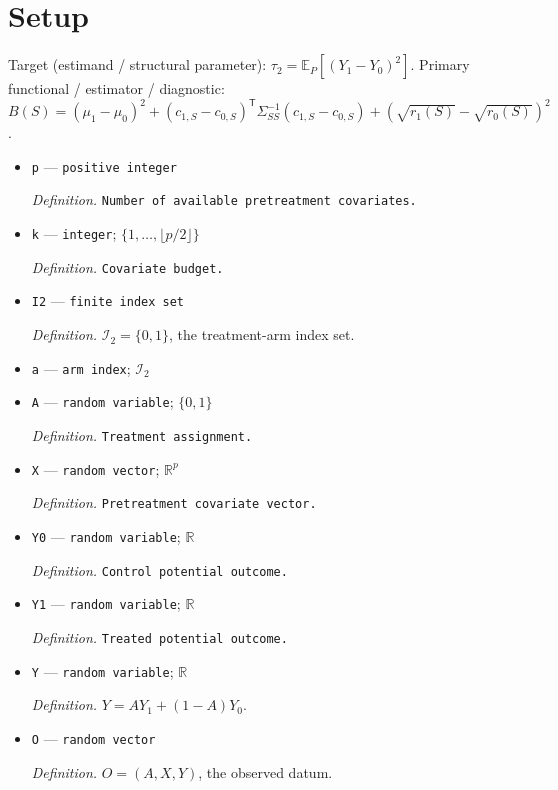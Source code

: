 \documentclass{article}
\begin{document}
\section{Setup}

Target (estimand / structural parameter): \(\tau_2=\mathbb E_P[(Y_1-Y_0)^2]\).
Primary functional / estimator / diagnostic: \(B(S)=(\mu_1-\mu_0)^2+(c_{1,S}-c_{0,S})^{\mathsf T}\Sigma_{SS}^{-1}(c_{1,S}-c_{0,S})+(\sqrt{r_1(S)}-\sqrt{r_0(S)})^2\).
\begin{itemize}
  \item \texttt{p} --- \texttt{positive integer}
  \par\smallskip\noindent\emph{Definition.} \texttt{Number of available pretreatment covariates.}
  \item \texttt{k} --- \texttt{integer}; \(\{1,\ldots,\lfloor p/2\rfloor\}\)
  \par\smallskip\noindent\emph{Definition.} \texttt{Covariate budget.}
  \item \texttt{I2} --- \texttt{finite index set}
  \par\smallskip\noindent\emph{Definition.} \(\mathcal I_2=\{0,1\}\), the treatment-arm index set.
  \item \texttt{a} --- \texttt{arm index}; \(\mathcal I_2\)
  \item \texttt{A} --- \texttt{random variable}; \(\{0,1\}\)
  \par\smallskip\noindent\emph{Definition.} \texttt{Treatment assignment.}
  \item \texttt{X} --- \texttt{random vector}; \(\mathbb R^p\)
  \par\smallskip\noindent\emph{Definition.} \texttt{Pretreatment covariate vector.}
  \item \texttt{Y0} --- \texttt{random variable}; \(\mathbb R\)
  \par\smallskip\noindent\emph{Definition.} \texttt{Control potential outcome.}
  \item \texttt{Y1} --- \texttt{random variable}; \(\mathbb R\)
  \par\smallskip\noindent\emph{Definition.} \texttt{Treated potential outcome.}
  \item \texttt{Y} --- \texttt{random variable}; \(\mathbb R\)
  \par\smallskip\noindent\emph{Definition.} \(Y=A Y_1+(1-A)Y_0\).
  \item \texttt{O} --- \texttt{random vector}
  \par\smallskip\noindent\emph{Definition.} \(O=(A,X,Y)\), the observed datum.

\end{itemize}
\end{document}
